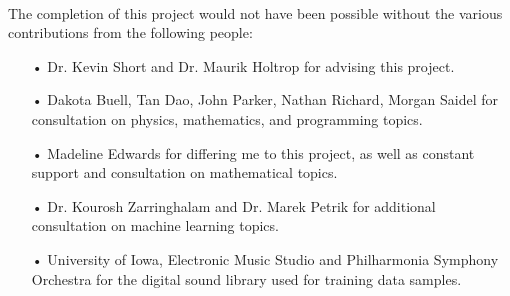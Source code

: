 \documentclass[12pt,letterpaper]{article}
\begin{document}
\paragraph*{}The completion of this project would not have been possible without the various contributions from the following people:

\begin{itemize}

\item[•]Dr. Kevin Short and Dr. Maurik Holtrop for advising this project.

\item[•]Dakota Buell, Tan Dao, John Parker, Nathan Richard, Morgan Saidel for consultation on physics, mathematics, and programming topics.

\item[•]Madeline Edwards for differing me to this project, as well as constant support and consultation on mathematical topics.

\item[•]Dr. Kourosh Zarringhalam and Dr. Marek Petrik for additional consultation on machine learning topics.

\item[•]University of Iowa, Electronic Music Studio and Philharmonia Symphony Orchestra for the digital sound library used for training data samples.

\end{itemize}


\newpage
\end{document}
